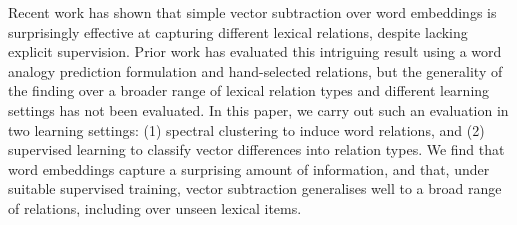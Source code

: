 Recent work has shown that simple vector subtraction over word embeddings is surprisingly effective at capturing different lexical relations, despite lacking explicit supervision. Prior work has evaluated this intriguing result using a word analogy prediction formulation and hand-selected relations, but the generality of the finding over a broader range of lexical relation types and different learning settings has not been evaluated. In this paper, we carry out such an evaluation in two learning settings: (1) spectral clustering to induce word relations, and (2) supervised learning to classify vector differences into relation types. We find that word embeddings capture a surprising amount of information, and that, under suitable supervised training, vector subtraction generalises well to a broad range of relations, including over unseen lexical items.
